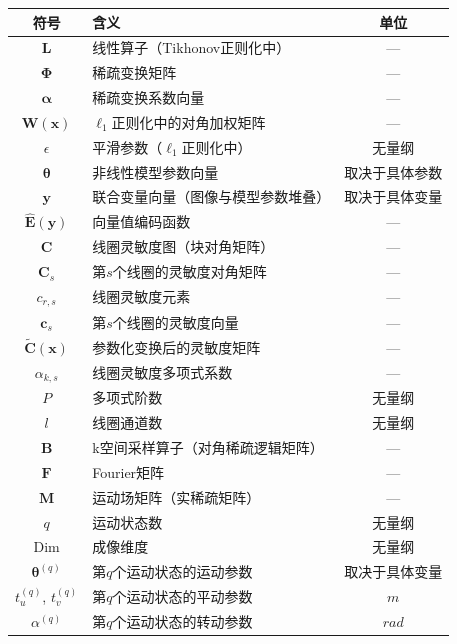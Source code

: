 \documentclass[12pt]{article}
\begin{document}
\begin{table}[h]
    \small
    \centering
    \begin{tabularx}{\textwidth}{c X c}
        \toprule
        \textbf{符号} & \textbf{含义} & \textbf{单位} \\
        \midrule
        $\mathbf{L}$ & 线性算子（Tikhonov正则化中） & --- \\
        $\bm{\Phi}$ & 稀疏变换矩阵 & --- \\
        $\bm{\alpha}$ & 稀疏变换系数向量 & --- \\
        $\mathbf{W}(\bm{x})$ & $\ell_1$正则化中的对角加权矩阵 & --- \\
        $\epsilon$ & 平滑参数（$\ell_1$正则化中） & 无量纲 \\
        $\bm{\theta}$ & 非线性模型参数向量 & 取决于具体参数 \\
        $\bm{y}$ & 联合变量向量（图像与模型参数堆叠） & 取决于具体变量 \\
        $\widehat{\bm{E}}(\bm{y})$ & 向量值编码函数 & --- \\
        $\mathbf{C}$ & 线圈灵敏度图（块对角矩阵） & --- \\
        $\mathbf{C}_s$ & 第$s$个线圈的灵敏度对角矩阵 & --- \\
        $c_{r,s}$ & 线圈灵敏度元素 & --- \\
        $\bm{c}_s$ & 第$s$个线圈的灵敏度向量 & --- \\
        $\tilde{\mathbf{C}}(\bm{x})$ & 参数化变换后的灵敏度矩阵 & --- \\
        $\alpha_{k,s}$ & 线圈灵敏度多项式系数 & --- \\
        $P$ & 多项式阶数 & 无量纲 \\
        $l$ & 线圈通道数 & 无量纲 \\
        $\mathbf{B}$ & k空间采样算子（对角稀疏逻辑矩阵） & --- \\
        $\mathbf{F}$ & Fourier矩阵 & --- \\
        $\mathbf{M}$ & 运动场矩阵（实稀疏矩阵） & --- \\
        $q$ & 运动状态数 & 无量纲 \\
        $\mathrm{Dim}$ & 成像维度 & 无量纲 \\
        $\bm{\theta}^{(q)}$ & 第$q$个运动状态的运动参数 & 取决于具体变量 \\
        $t_u^{(q)}$, $t_v^{(q)}$ & 第$q$个运动状态的平动参数 & $\si{m}$ \\
        $\alpha^{(q)}$ & 第$q$个运动状态的转动参数 & $\si{rad}$ \\

\end{tabularx}
\end{table}
\end{document}
